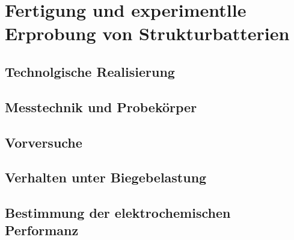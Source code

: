 \chapter{Fertigung und experimentlle Erprobung von Strukturbatterien}
\section{Technolgische Realisierung}
\section{Messtechnik und Probekörper}
\section{Vorversuche}
\section{Verhalten unter Biegebelastung}
\section{Bestimmung der elektrochemischen Performanz}
